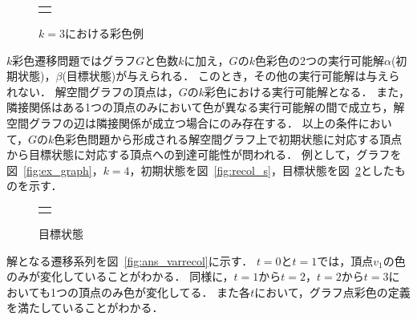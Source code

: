 \begin{figure}[htbp]
  \centering
  \begin{tabular}{c}
    
    \begin{minipage}{0.45\hsize}
      \centering
      
      \caption{グラフ}
      \label{fig:ex_graph}
    \end{minipage}

    \begin{minipage}{0.45\hsize}
      \centering
      
      \caption{$k=3$における彩色例}
      \label{fig:graph_col}
    \end{minipage}

  \end{tabular}  
\end{figure}

$k$彩色遷移問題ではグラフ$G$と色数$k$に加え，$G$の$k$色彩色の2つの実行可能解$\alpha$(初期状態)，$\beta$(目標状態)が与えられる． 
このとき，その他の実行可能解は与えられない． 
解空間グラフの頂点は，$G$の$k$彩色における実行可能解となる．
また，隣接関係はある1つの頂点のみにおいて色が異なる実行可能解の間で成立ち，解空間グラフの辺は隣接関係が成立つ場合にのみ存在する．
以上の条件において，$G$の$k$色彩色問題から形成される解空間グラフ上で初期状態に対応する頂点から目標状態に対応する頂点への到達可能性が問われる． 
例として，グラフを図~\ref{fig:ex_graph}，$k=4$，初期状態を図~\ref{fig:recol_s}，目標状態を図~\ref{fig:recol_g}としたものを示す．

\begin{figure}[htbp]
  \centering
  \begin{tabular}{c}

    \begin{minipage}{0.45\hsize}
      \centering
      
      \caption{初期状態}
      \label{fig:recol_s}
    \end{minipage}

    \begin{minipage}{0.45\hsize}
      \centering
      
      \caption{目標状態}
      \label{fig:recol_g}
    \end{minipage}
    
  \end{tabular}
\end{figure}

解となる遷移系列を図~\ref{fig:ans_varrecol}に示す． $t=0$と$t=1$では，頂点$v_1$の色のみが変化していることがわかる． 
同様に，$t=1$から$t=2$，$t=2$から$t=3$においても1つの頂点のみ色が変化してる． 
また各$t$において，グラフ点彩色の定義を満たしていることがわかる．


